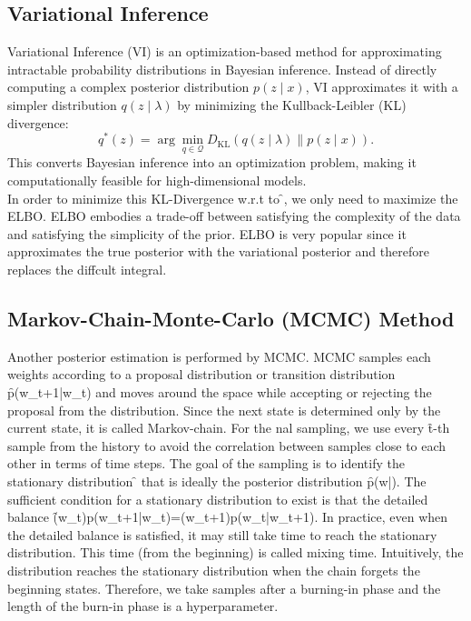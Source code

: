 \subsection{Variational Inference}
Variational Inference (VI) is an optimization-based method for approximating intractable probability distributions in Bayesian inference. Instead of directly computing a complex posterior distribution \( p(z \mid x) \), VI approximates it with a simpler distribution \( q(z \mid \lambda) \) by minimizing the Kullback-Leibler (KL) divergence:
\[
q^*(z) = \arg\min_{q \in \mathcal{Q}} D_{\text{KL}}(q(z \mid \lambda) \parallel p(z \mid x)).
\]
This converts Bayesian inference into an optimization problem, making it computationally feasible for high-dimensional models.\\
In order to minimize this KL-Divergence w.r.t to \f{\theta}, we only need to maximize the ELBO. ELBO embodies a trade-off between satisfying the complexity of the data and satisfying the simplicity of the prior. ELBO is very popular since it approximates the true posterior with the variational posterior and therefore replaces the diffcult integral.

\subsection{Markov-Chain-Monte-Carlo (MCMC) Method}
Another posterior estimation is performed by MCMC. MCMC samples each weights according to a
proposal distribution or transition distribution \f{p(w_{t+1}|w_t)} and moves around the space while accepting or rejecting the proposal from the distribution. Since the next state is determined only by the current state, it is called Markov-chain. For the nal sampling, we use every \f{t}-th sample from the history to avoid the correlation between samples close to each other in terms of time steps. The goal of the sampling is to identify the stationary distribution \f{\pi} that is ideally the posterior distribution
\f{p(w|)}. The sufficient condition for a stationary distribution to exist is that the detailed balance \f{\pi(w_t)p(w_{t+1}|w_t)=\pi(w_{t+1})p(w_t|w_{t+1})}. In practice, even when the detailed balance is satisfied, it may still take time to reach the stationary distribution. This time (from the beginning) is called mixing time. Intuitively, the distribution reaches the stationary distribution when the chain forgets the beginning states. Therefore, we take samples after a burning-in phase and the length of the burn-in phase is a hyperparameter.


